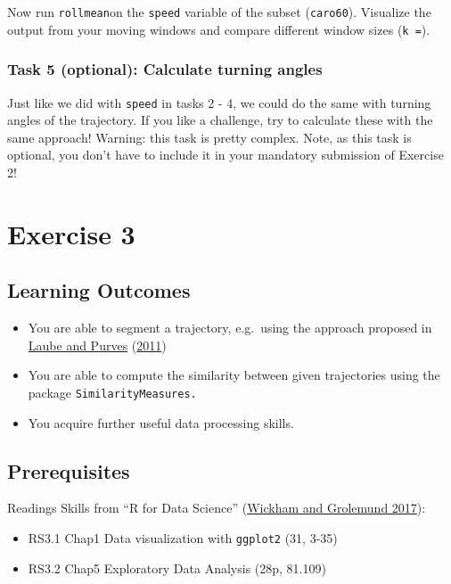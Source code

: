 \documentclass[
]{book}
\providecommand{\tightlist}{%
  \setlength{\itemsep}{0pt}\setlength{\parskip}{0pt}}
\begin{document}
Now run \texttt{rollmean}on the \texttt{speed} variable of the subset (\texttt{caro60}). Visualize the output from your moving windows and compare different window sizes (\texttt{k\ =}).

\hypertarget{task-5-optional-calculate-turning-angles}{%
\subsection{Task 5 (optional): Calculate turning angles}\label{task-5-optional-calculate-turning-angles}}

Just like we did with \texttt{speed} in tasks 2 - 4, we could do the same with turning angles of the trajectory. If you like a challenge, try to calculate these with the same approach! Warning: this task is pretty complex. Note, as this task is optional, you don't have to include it in your mandatory submission of Exercise 2!

\hypertarget{exercise-3}{%
\chapter{Exercise 3}\label{exercise-3}}

\hypertarget{learning-outcomes-2}{%
\section{Learning Outcomes}\label{learning-outcomes-2}}

\begin{itemize}
\tightlist
\item
  You are able to segment a trajectory, e.g.~using the approach proposed in \protect\hyperlink{ref-laube2011}{Laube and Purves} (\protect\hyperlink{ref-laube2011}{2011})
\item
  You are able to compute the similarity between given trajectories using the package \texttt{SimilarityMeasures.}
\item
  You acquire further useful data processing skills.
\end{itemize}

\hypertarget{prerequisites-2}{%
\section{Prerequisites}\label{prerequisites-2}}

Readings Skills from ``R for Data Science'' (\protect\hyperlink{ref-wickham2017}{Wickham and Grolemund 2017}):

\begin{itemize}
\tightlist
\item
  RS3.1 Chap1 Data visualization with \texttt{ggplot2} (31, 3-35)
\item
  RS3.2 Chap5 Exploratory Data Analysis (28p, 81.109)
\end{itemize}
\end{document}
